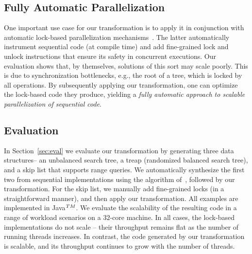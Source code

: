 \subsection{Fully Automatic Parallelization}
One important use case for our transformation is to apply it in conjunction with automatic lock-based
parallelization mechanisms~\cite{Gueta2011,MZGB:POPL06}.
The latter automatically instrument sequential code (at compile time)
and add fine-grained lock and unlock instructions that ensure its safety in concurrent executions.
Our evaluation shows that, by themselves, solutions of this sort may scale poorly.
This is due to synchronization bottlenecks, e.g., the root of a tree,
which is locked by all operations.
By subsequently applying our transformation, one can optimize
the lock-based code they produce, yielding a \emph{fully automatic approach to
scalable parallelization of sequential code}.


\subsection{Evaluation}
In Section~\ref{sec:eval} we evaluate our transformation by generating three data structures-- an unbalanced search tree, a treap
(randomized balanced search tree),
and a skip list that supports range queries. We automatically synthesize the first two from sequential implementations using the algorithm of~\cite{Gueta2011}, followed by our transformation.
For the skip list, we manually add fine-grained locks (in a straightforward manner), and then apply our transformation.
All examples are implemented in Java$^{\sc TM}$. We evaluate the scalability of the resulting code
in a range of workload scenarios on a $32$-core machine.
In all cases, the lock-based implementations do not scale --
their throughput remains flat as the number of running threads increases. In contrast, the code generated by our transformation
is scalable, and its throughput continues to grow with the number of threads.

